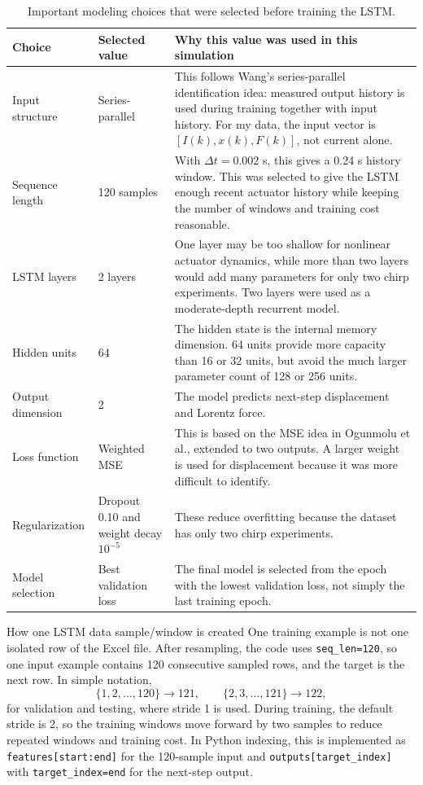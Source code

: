 \documentclass[11pt]{article}
\begin{document}
\begin{table}[H]
\centering
\small
\begin{tabular}{p{3.6cm}p{2.6cm}p{8.0cm}}
\toprule
Choice & Selected value & Why this value was used in this simulation \\
\midrule
Input structure & Series-parallel & This follows Wang's series-parallel identification idea: measured output history is used during training together with input history. For my data, the input vector is $[I(k),x(k),F(k)]$, not current alone. \\
Sequence length & 120 samples & With $\Delta t=0.002$ s, this gives a 0.24 s history window. This was selected to give the LSTM enough recent actuator history while keeping the number of windows and training cost reasonable. \\
LSTM layers & 2 layers & One layer may be too shallow for nonlinear actuator dynamics, while more than two layers would add many parameters for only two chirp experiments. Two layers were used as a moderate-depth recurrent model. \\
Hidden units & 64 & The hidden state is the internal memory dimension. 64 units provide more capacity than 16 or 32 units, but avoid the much larger parameter count of 128 or 256 units. \\
Output dimension & 2 & The model predicts next-step displacement and Lorentz force. \\
Loss function & Weighted MSE & This is based on the MSE idea in Ogunmolu et al., extended to two outputs. A larger weight is used for displacement because it was more difficult to identify. \\
Regularization & Dropout 0.10 and weight decay $10^{-5}$ & These reduce overfitting because the dataset has only two chirp experiments. \\
Model selection & Best validation loss & The final model is selected from the epoch with the lowest validation loss, not simply the last training epoch. \\
\bottomrule
\end{tabular}
\caption{Important modeling choices that were selected before training the LSTM.}
\label{tab:main_choices}
\end{table}

\begin{datadecisionbox}{How one LSTM data sample/window is created}
One training example is not one isolated row of the Excel file. After resampling, the code uses \texttt{seq\_len=120}, so one input example contains 120 consecutive sampled rows, and the target is the next row. In simple notation,
\begin{equation}
\{1,2,\ldots,120\}\rightarrow 121,
\qquad
\{2,3,\ldots,121\}\rightarrow 122,
\end{equation}
for validation and testing, where stride 1 is used. During training, the default stride is 2, so the training windows move forward by two samples to reduce repeated windows and training cost. In Python indexing, this is implemented as \texttt{features[start:end]} for the 120-sample input and \texttt{outputs[target\_index]} with \texttt{target\_index=end} for the next-step output.
\end{datadecisionbox}
\end{document}
